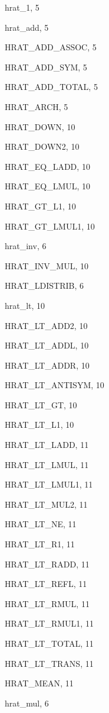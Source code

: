 \begin{theindex}
  \item {\ptt hrat\_1}, 5
  \item {\ptt hrat\_add}, 5
  \item {\ptt HRAT\_ADD\_ASSOC}, 5
  \item {\ptt HRAT\_ADD\_SYM}, 5
  \item {\ptt HRAT\_ADD\_TOTAL}, 5
  \item {\ptt HRAT\_ARCH}, 5
  \item {\ptt HRAT\_DOWN}, 10
  \item {\ptt HRAT\_DOWN2}, 10
  \item {\ptt HRAT\_EQ\_LADD}, 10
  \item {\ptt HRAT\_EQ\_LMUL}, 10
  \item {\ptt HRAT\_GT\_L1}, 10
  \item {\ptt HRAT\_GT\_LMUL1}, 10
  \item {\ptt hrat\_inv}, 6
  \item {\ptt HRAT\_INV\_MUL}, 10
  \item {\ptt HRAT\_LDISTRIB}, 6
  \item {\ptt hrat\_lt}, 10
  \item {\ptt HRAT\_LT\_ADD2}, 10
  \item {\ptt HRAT\_LT\_ADDL}, 10
  \item {\ptt HRAT\_LT\_ADDR}, 10
  \item {\ptt HRAT\_LT\_ANTISYM}, 10
  \item {\ptt HRAT\_LT\_GT}, 10
  \item {\ptt HRAT\_LT\_L1}, 10
  \item {\ptt HRAT\_LT\_LADD}, 11
  \item {\ptt HRAT\_LT\_LMUL}, 11
  \item {\ptt HRAT\_LT\_LMUL1}, 11
  \item {\ptt HRAT\_LT\_MUL2}, 11
  \item {\ptt HRAT\_LT\_NE}, 11
  \item {\ptt HRAT\_LT\_R1}, 11
  \item {\ptt HRAT\_LT\_RADD}, 11
  \item {\ptt HRAT\_LT\_REFL}, 11
  \item {\ptt HRAT\_LT\_RMUL}, 11
  \item {\ptt HRAT\_LT\_RMUL1}, 11
  \item {\ptt HRAT\_LT\_TOTAL}, 11
  \item {\ptt HRAT\_LT\_TRANS}, 11
  \item {\ptt HRAT\_MEAN}, 11
  \item {\ptt hrat\_mul}, 6

\end{theindex}
